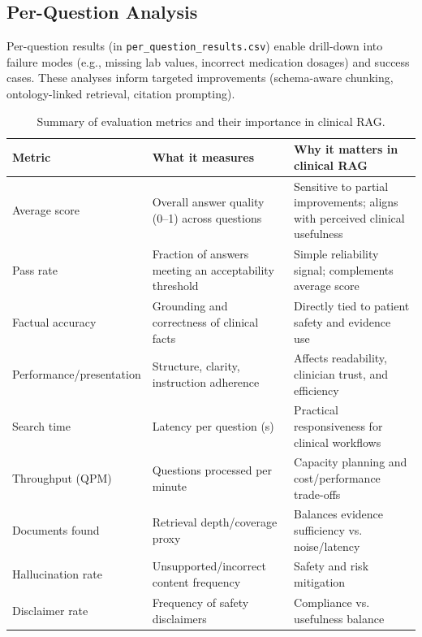 \subsection{Per-Question Analysis}
Per-question results (in \texttt{per\_question\_results.csv}) enable drill-down into failure modes (e.g., missing lab values, incorrect medication dosages) and success cases. These analyses inform targeted improvements (schema-aware chunking, ontology-linked retrieval, citation prompting).

\begin{table}[h]
\centering
\begin{footnotesize}
\renewcommand\arraystretch{0.95}
\begin{tabularx}{\textwidth}{l X X}
  \toprule
  Metric & What it measures & Why it matters in clinical RAG \\
  \midrule
  Average score & Overall answer quality (0--1) across questions & Sensitive to partial improvements; aligns with perceived clinical usefulness \\[3em]
  Pass rate & Fraction of answers meeting an acceptability threshold & Simple reliability signal; complements average score \\[2em]
  Factual accuracy & Grounding and correctness of clinical facts & Directly tied to patient safety and evidence use \\[2em]
  Performance/presentation & Structure, clarity, instruction adherence & Affects readability, clinician trust, and efficiency \\[2em]
  Search time & Latency per question (s) & Practical responsiveness for clinical workflows \\[2em]
  Throughput (QPM) & Questions processed per minute & Capacity planning and cost/performance trade-offs \\[2em]
  Documents found & Retrieval depth/coverage proxy & Balances evidence sufficiency vs. noise/latency \\[2em]
  Hallucination rate & Unsupported/incorrect content frequency & Safety and risk mitigation \\[2em]
  Disclaimer rate & Frequency of safety disclaimers & Compliance vs. usefulness balance \\[4pt]
  \bottomrule
\end{tabularx}
\end{footnotesize}
\caption{Summary of evaluation metrics and their importance in clinical RAG.}
\label{tab:metrics_summary}
\end{table}

